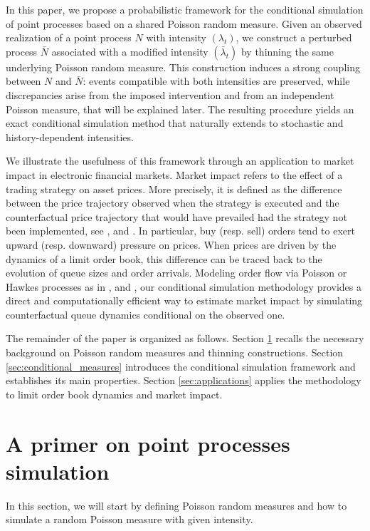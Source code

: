 \documentclass{article} %
\newcommand{\1}{\mathbbm{1}} %
\begin{document}
In this paper, we propose a probabilistic framework for the conditional simulation of point processes based on a shared Poisson random measure. Given an observed realization of a point process $N$ with intensity $(\lambda_t)$, we construct a perturbed process $\bar N$ associated with a modified intensity $(\bar\lambda_t)$ by thinning the same underlying Poisson random measure. This construction induces a strong coupling between $N$ and $\bar N$: events compatible with both intensities are preserved, while discrepancies arise  from the imposed intervention and from an independent Poisson measure, that will be explained later. The resulting procedure yields an exact conditional simulation method that naturally extends to stochastic and history-dependent intensities.

We illustrate the usefulness of this framework through an application to market impact in electronic financial markets. Market impact refers to the effect of a trading strategy on asset prices. More precisely, it is defined as the difference between the price trajectory observed when the strategy is executed and the counterfactual price trajectory that would have prevailed had the strategy not been implemented, see \citet{almgren2001optimal}, and \citet{bouchaud2009markets}. In particular, buy (resp. sell) orders tend to exert upward (resp. downward) pressure on prices. When prices are driven by the dynamics of a limit order book, this difference can be traced back to the evolution of queue sizes and order arrivals. Modeling order flow via Poisson or Hawkes processes as in \citet{bacry2015hawkes, jaisson2015market}, and \citet{jusselin2020noarbitrage}, our conditional simulation methodology provides a direct and computationally efficient way to estimate market impact by simulating counterfactual queue dynamics conditional on the observed one.

The remainder of the paper is organized as follows. Section \ref{sec:primer} recalls the necessary background on Poisson random measures and thinning constructions. Section \ref{sec:conditional_measures} introduces the conditional simulation framework and establishes its main properties. Section \ref{sec:applications} applies the methodology to limit order book dynamics and market impact.
\section{A primer on point processes simulation}
\label{sec:primer}
In this section, we will start by defining Poisson random measures and how to simulate a random Poisson measure with given intensity.
\end{document}
